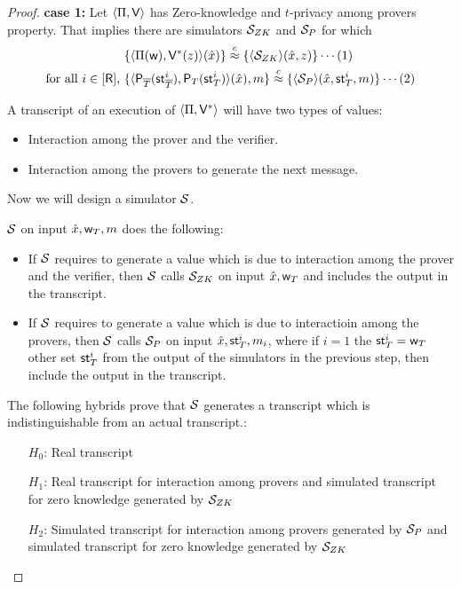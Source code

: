\begin{proof}
	\textbf{case 1:} Let $\langle \Pi,\mathsf{V}\rangle$ has Zero-knowledge and $t$-privacy among provers property. That implies there are simulators $\mathcal{S}_{ZK}$ and $\mathcal{S}_{P}$ for which 
	\begin{align*}
		&\{ \langle  \Pi( \mathsf{w} ) , \mathsf{V}^*( z ) \rangle ( \hat{x}) \} \stackrel{c}{\approx} \{ \langle \mathcal{S}_{ZK} \rangle(\hat{x}, z) \} \cdots (1)\\		
		\text{for all }i \in [\mathsf{R}] \text{, } &\{ \langle  \mathsf{P}_{\overline{T}}( \mathsf{st}^i_{\overline{T}} ) , \mathsf{P}_T ( \mathsf{st}^i_T ) \rangle ( \hat{x} ) , m \}
	 \stackrel{c}{\approx} \{ \langle \mathcal{S}_P \rangle (\hat{x}, \mathsf{st}^i_T, m) \} \cdots (2)
	\end{align*}
	
	A transcript of an execution of $\langle \Pi,\mathsf{V}^*\rangle$ will have two types of values:

	\begin{itemize}
		\item Interaction among the prover and the verifier.
		\item Interaction among the provers to generate the next message.		
	\end{itemize}
	Now we will design a simulator $\mathcal{S}$.
	
	$\mathcal{S}$ on input $\hat{x}, \mathsf{w}_T, m$ does the following: 
	\begin{itemize}
		\item If $\mathcal{S}$ requires to generate a value which is due to interaction among the prover and the verifier, then $\mathcal{S}$ calls $\mathcal{S}_{ZK}$ on input $\hat{x}, \mathsf{w}_T$ and includes the output in the transcript.
		\item If $\mathcal{S}$ requires to generate a value which is due to interactioin among the provers, then $\mathcal{S}$ calls $\mathcal{S}_{P}$ on input $\hat{x}, \mathsf{st}^i_T, m_i$, where if $i=1$ the $\mathsf{st}^i_T = \mathsf{w}_T$ other set $\mathsf{st}^i_T$ from the output of the simulators in the previous step, then include the output in the transcript.
	\end{itemize}
	The following hybrids prove that $\mathcal{S}$ generates a transcript which is indistinguishable from an actual transcript.:
	\begin{itemize}
		\item[$H_0$:] Real transcript
		\item[$H_1$:] Real transcript for interaction among provers and simulated transcript for zero knowledge generated by $\mathcal{S}_{ZK}$
		\item[$H_2$:] Simulated transcript for interaction among provers generated by $\mathcal{S}_P$ and simulated transcript for zero knowledge generated by $\mathcal{S}_{ZK}$
	\end{itemize}


\end{proof}
